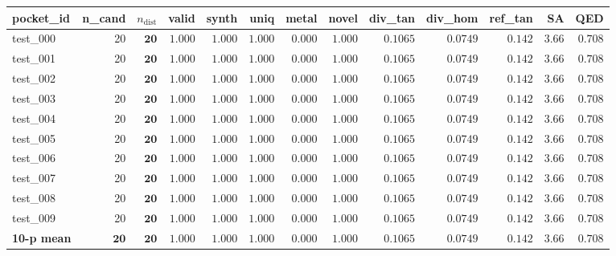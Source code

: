 \begin{table}[ht]
\centering
\small
\setlength{\tabcolsep}{4pt}
\begin{tabular}{lrrrrrrrrrrrr}
\toprule
\textbf{pocket\_id} & \textbf{n\_cand} & \textbf{$n_{\text{dist}}$} & \textbf{valid} & \textbf{synth} & \textbf{uniq} & \textbf{metal} & \textbf{novel} & \textbf{div\_tan} & \textbf{div\_hom} & \textbf{ref\_tan} & \textbf{SA} & \textbf{QED} \\
\midrule
test\_000 & 20 & $\mathbf{20}$ & $1.000$ & $1.000$ & $1.000$ & $\mathbf{0.000}$ & $1.000$ & $\mathbf{0.1065}$ & $\mathbf{0.0749}$ & $0.142$ & $3.66$ & $0.708$ \\
test\_001 & 20 & $\mathbf{20}$ & $1.000$ & $1.000$ & $1.000$ & $\mathbf{0.000}$ & $1.000$ & $\mathbf{0.1065}$ & $\mathbf{0.0749}$ & $0.142$ & $3.66$ & $0.708$ \\
test\_002 & 20 & $\mathbf{20}$ & $1.000$ & $1.000$ & $1.000$ & $\mathbf{0.000}$ & $1.000$ & $\mathbf{0.1065}$ & $\mathbf{0.0749}$ & $0.142$ & $3.66$ & $0.708$ \\
test\_003 & 20 & $\mathbf{20}$ & $1.000$ & $1.000$ & $1.000$ & $\mathbf{0.000}$ & $1.000$ & $\mathbf{0.1065}$ & $\mathbf{0.0749}$ & $0.142$ & $3.66$ & $0.708$ \\
test\_004 & 20 & $\mathbf{20}$ & $1.000$ & $1.000$ & $1.000$ & $\mathbf{0.000}$ & $1.000$ & $\mathbf{0.1065}$ & $\mathbf{0.0749}$ & $0.142$ & $3.66$ & $0.708$ \\
test\_005 & 20 & $\mathbf{20}$ & $1.000$ & $1.000$ & $1.000$ & $\mathbf{0.000}$ & $1.000$ & $\mathbf{0.1065}$ & $\mathbf{0.0749}$ & $0.142$ & $3.66$ & $0.708$ \\
test\_006 & 20 & $\mathbf{20}$ & $1.000$ & $1.000$ & $1.000$ & $\mathbf{0.000}$ & $1.000$ & $\mathbf{0.1065}$ & $\mathbf{0.0749}$ & $0.142$ & $3.66$ & $0.708$ \\
test\_007 & 20 & $\mathbf{20}$ & $1.000$ & $1.000$ & $1.000$ & $\mathbf{0.000}$ & $1.000$ & $\mathbf{0.1065}$ & $\mathbf{0.0749}$ & $0.142$ & $3.66$ & $0.708$ \\
test\_008 & 20 & $\mathbf{20}$ & $1.000$ & $1.000$ & $1.000$ & $\mathbf{0.000}$ & $1.000$ & $\mathbf{0.1065}$ & $\mathbf{0.0749}$ & $0.142$ & $3.66$ & $0.708$ \\
test\_009 & 20 & $\mathbf{20}$ & $1.000$ & $1.000$ & $1.000$ & $\mathbf{0.000}$ & $1.000$ & $\mathbf{0.1065}$ & $\mathbf{0.0749}$ & $0.142$ & $3.66$ & $0.708$ \\
\midrule
\textbf{10-p mean} & $\mathbf{20}$ & $\mathbf{20}$ & $\mathbf{1.000}$ & $\mathbf{1.000}$ & $\mathbf{1.000}$ & $\mathbf{0.000}$ & $\mathbf{1.000}$ & $\mathbf{0.1065}$ & $\mathbf{0.0749}$ & $\mathbf{0.142}$ & $\mathbf{3.66}$ & $\mathbf{0.708}$ \\

\end{tabular}
\end{table}
